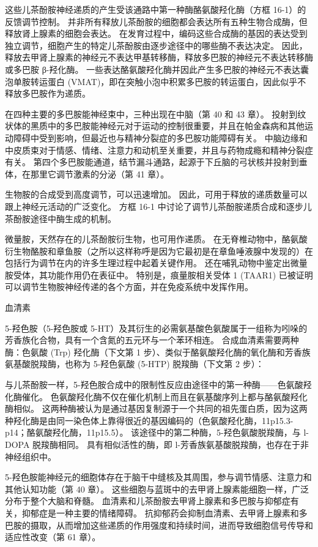 这些儿茶酚胺神经递质的产生受该通路中第一种酶酪氨酸羟化酶（方框 16-1）的反馈调节控制。 并非所有释放儿茶酚胺的细胞都会表达所有五种生物合成酶，但释放肾上腺素的细胞会表达。 在发育过程中，编码这些合成酶的基因的表达受到独立调节，细胞产生的特定儿茶酚胺由逐步途径中的哪些酶不表达决定。 因此，释放去甲肾上腺素的神经元不表达甲基转移酶，释放多巴胺的神经元不表达转移酶或多巴胺 β-羟化酶。 一些表达酪氨酸羟化酶并因此产生多巴胺的神经元不表达囊泡单胺转运蛋白 (VMAT)，即在突触小泡中积累多巴胺的转运蛋白，因此似乎不释放多巴胺作为递质。

在四种主要的多巴胺能神经束中，三种出现在中脑（第 40 和 43 章）。 投射到纹状体的黑质中的多巴胺能神经元对于运动的控制很重要，并且在帕金森病和其他运动障碍中受到影响，但最近也与精神分裂症的多巴胺功能障碍有关。 中脑边缘和中皮质束对于情感、情绪、注意力和动机至关重要，并且与药物成瘾和精神分裂症有关。 第四个多巴胺能通道，结节漏斗通路，起源于下丘脑的弓状核并投射到垂体，在那里它调节激素的分泌（第 41 章）。

生物胺的合成受到高度调节，可以迅速增加。 因此，可用于释放的递质数量可以跟上神经元活动的广泛变化。 方框 16-1 中讨论了调节儿茶酚胺递质合成和逐步儿茶酚胺途径中酶生成的机制。

微量胺，天然存在的儿茶酚胺衍生物，也可用作递质。 在无脊椎动物中，酪氨酸衍生物酪胺和章鱼胺（之所以这样称呼是因为它最初是在章鱼唾液腺中发现的）在包括行为调节在内的许多生理过程中起着关键作用。 还在哺乳动物中鉴定出微量胺受体，其功能作用仍在表征中。 特别是，痕量胺相关受体 1 (TAAR1) 已被证明可以调节生物胺神经传递的各个方面，并在免疫系统中发挥作用。

血清素

5-羟色胺（5-羟色胺或 5-HT）及其衍生的必需氨基酸色氨酸属于一组称为吲哚的芳香族化合物，具有一个含氮的五元环与一个苯环相连。 合成血清素需要两种酶：色氨酸 (Trp) 羟化酶（下文第 1 步）、类似于酪氨酸羟化酶的氧化酶和芳香族氨基酸脱羧酶，也称为 5-羟色氨酸 (5-HTP) 脱羧酶（下文第 2 步）：

与儿茶酚胺一样，5-羟色胺合成中的限制性反应由途径中的第一种酶——色氨酸羟化酶催化。 色氨酸羟化酶不仅在催化机制上而且在氨基酸序列上都与酪氨酸羟化酶相似。 这两种酶被认为是通过基因复制源于一个共同的祖先蛋白质，因为这两种羟化酶是由同一染色体上靠得很近的基因编码的（色氨酸羟化酶，11p15.3-p14；酪氨酸羟化酶，11p15.5）。 该途径中的第二种酶，5-羟色氨酸脱羧酶，与 l-DOPA 脱羧酶相同。 具有相似活性的酶，即 l-芳香族氨基酸脱羧酶，也存在于非神经组织中。

5-羟色胺能神经元的细胞体存在于脑干中缝核及其周围，参与调节情感、注意力和其他认知功能（第 40 章）。 这些细胞与蓝斑中的去甲肾上腺素能细胞一样，广泛分布于整个大脑和脊髓。 血清素和儿茶酚胺去甲肾上腺素和多巴胺与抑郁症有关，抑郁症是一种主要的情绪障碍。 抗抑郁药会抑制血清素、去甲肾上腺素和多巴胺的摄取，从而增加这些递质的作用强度和持续时间，进而导致细胞信号传导和适应性改变（第 61 章）。

